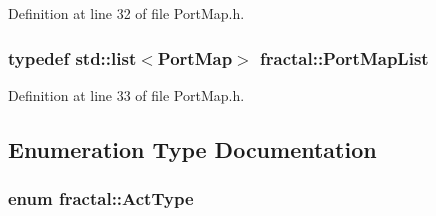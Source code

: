Definition at line 32 of file Port\+Map.\+h.

\hypertarget{namespacefractal_a9697dee0746adccf37331470de749c2b}{
\subsubsection[{Port\+Map\+List}]{\setlength{\rightskip}{0pt plus 5cm}typedef std\+::list$<${\bf Port\+Map}$>$ {\bf fractal\+::\+Port\+Map\+List}}}\label{namespacefractal_a9697dee0746adccf37331470de749c2b}


Definition at line 33 of file Port\+Map.\+h.



\subsection{Enumeration Type Documentation}
\hypertarget{namespacefractal_a6b4f3887f3de57d4b1cbb00d198833ec}{
\subsubsection[{Act\+Type}]{\setlength{\rightskip}{0pt plus 5cm}enum {\bf fractal\+::\+Act\+Type}}}\label{namespacefractal_a6b4f3887f3de57d4b1cbb00d198833ec}
